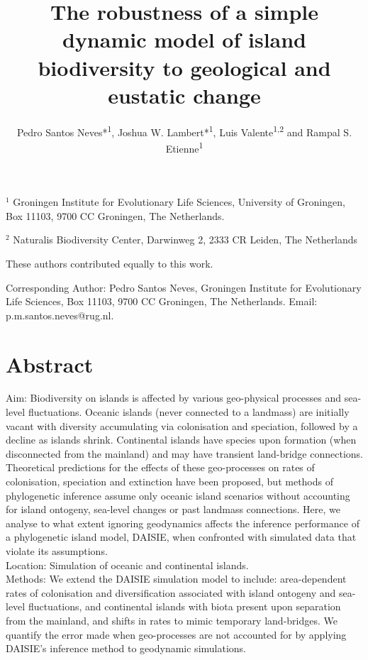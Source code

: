 \documentclass{article}
\title{The robustness of a simple dynamic model of island biodiversity to geological and eustatic change}
\author{Pedro Santos Neves*\textsuperscript{1}, Joshua W. Lambert*\textsuperscript{1}, Luis Valente\textsuperscript{1,2} and Rampal S. Etienne\textsuperscript{1}}
\date{}
\begin{document}
\maketitle

\noindent $^{1}$ Groningen Institute for Evolutionary Life Sciences, University of
Groningen, Box 11103, 9700 CC Groningen, The Netherlands.

\noindent $^{2}$ Naturalis Biodiversity Center, Darwinweg 2, 2333 CR Leiden, The Netherlands 

\noindent * These authors contributed equally to this work.

\noindent Corresponding Author: Pedro Santos Neves, Groningen Institute for Evolutionary Life Sciences, Box 11103, 9700 CC Groningen, The Netherlands. Email: p.m.santos.neves@rug.nl.

\section*{Abstract}

Aim: Biodiversity on islands is affected by various geo-physical processes and sea-level fluctuations. Oceanic islands (never connected to a landmass) are initially vacant with diversity accumulating via colonisation and speciation, followed by a decline as islands shrink. Continental islands have species upon formation (when disconnected from the mainland) and may have transient land-bridge connections. Theoretical predictions for the effects of these geo-processes on rates of colonisation, speciation and extinction have been proposed, but methods of phylogenetic inference assume only oceanic island scenarios without accounting for island ontogeny, sea-level changes or past landmass connections. Here, we analyse to what extent ignoring geodynamics affects the inference performance of a phylogenetic island model, DAISIE, when confronted with simulated data that violate its assumptions. \\

\noindent Location: Simulation of oceanic and continental islands. \\

\noindent Methods: We extend the DAISIE simulation model to include: area-dependent rates of colonisation and diversification associated with island ontogeny and sea-level fluctuations, and continental islands with biota present upon separation from the mainland, and shifts in rates to mimic temporary land-bridges. We quantify the error made when geo-processes are not accounted for by applying DAISIE’s inference method to geodynamic simulations. \\
\end{document}
